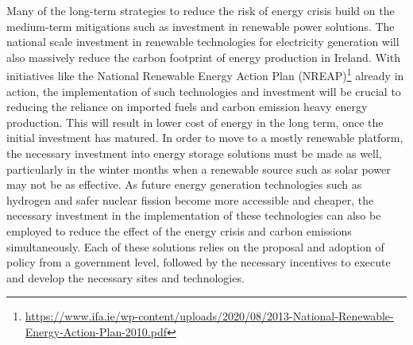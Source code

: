 \documentclass{article}
\begin{document}
    Many of the long-term strategies to reduce the risk of energy crisis build on the medium-term mitigations such as investment in renewable power solutions. The national scale investment in renewable technologies for electricity generation will also massively reduce the carbon footprint of energy production in Ireland. With initiatives like the National Renewable Energy Action Plan (NREAP)\footnote{\url{https://www.ifa.ie/wp-content/uploads/2020/08/2013-National-Renewable-Energy-Action-Plan-2010.pdf}} already in action, the implementation of such technologies and investment will be crucial to reducing the reliance on imported fuels and carbon emission heavy energy production. This will result in lower cost of energy in the long term, once the initial investment has matured. In order to move to a mostly renewable platform, the necessary investment into energy storage solutions must be made as well, particularly in the winter months when a renewable source such as solar power may not be as effective. As future energy generation technologies such as hydrogen and safer nuclear fission become more accessible and cheaper, the necessary investment in the implementation of these technologies can also be employed to reduce the effect of the energy crisis and carbon emissions simultaneously. Each of these solutions relies on the proposal and adoption of policy from a government level, followed by the necessary incentives to execute and develop the necessary sites and technologies.
    
\end{document}
